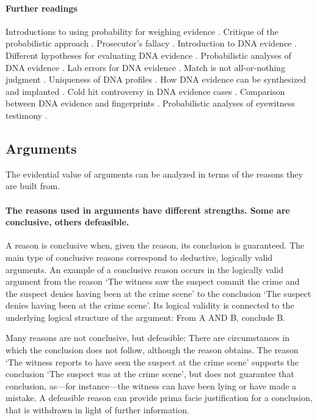 \documentclass[10pt]{article}
\begin{document}
\paragraph{Further readings} Introductions to using probability for weighing evidence 
 \citep{finkelsteinFairley1970, dawid2002, mortera2007}. Critique 
of the probabilistic approach \citep{tribe1971, cohen1977, allenPardo2007}.
Prosecutor's fallacy \citep{thompsonSchuman1987}.
Introduction to DNA evidence \citep{wasserman2008, kayeSensabaugh2000}.
Different hypotheses for evaluating DNA evidence \citep{koehler1993, cookEtAl1998, evettEtal2000}. 
Probabilistic analyses of DNA evidence  \citep{robertsonVignaux1995, buckleton2005, balding2005}. 
 Lab errors for DNA evidence \citep{thompsonEtAl2003}. 
 Match is not all-or-nothing judgment \citep{kaye1993}. 
Uniqueness of DNA profiles  \citep{kaye2013, weir2007}.
How DNA evidence can be synthesized and implanted \citep{frumkinEtAl2009}. 
Cold hit controversy in DNA evidence cases \citep{NRC1996, baldingDonnely1996}. 
Comparison between DNA evidence and fingerprints  \citep{zabell2005}. 
Probabilistic analyses of eyewitness testimony \citep{friedman1987, schumStarace2001}. 

\subsection{Arguments}
\label{sec:valueArgs}

The evidential value of arguments can be analyzed in terms of the reasons they are built from.

\paragraph{The reasons used in arguments have different strengths. Some are conclusive, others defeasible.} A reason is conclusive when, given  the reason, its conclusion is guaranteed. The main type of conclusive reasons correspond to deductive, logically valid arguments. An example of a conclusive reason occurs in the logically valid argument from the reason `The witness saw the suspect commit the crime and the suspect denies having been at the crime scene' to the conclusion `The suspect denies having been at the crime scene'. Its logical validity is connected to the underlying logical structure of the argument: From A AND B, conclude B. 

Many reasons are not conclusive, but defeasible: There are circumstances in which the conclusion does not follow, although the reason obtains. The reason `The witness reports to have seen the suspect at the crime scene' supports the conclusion `The suspect was at the crime scene', but does not guarantee that conclusion, as---for instance---the witness can have been lying or have made a mistake. A defeasible reason can provide prima facie justification for a conclusion, that is withdrawn in light of further information.
\end{document}
